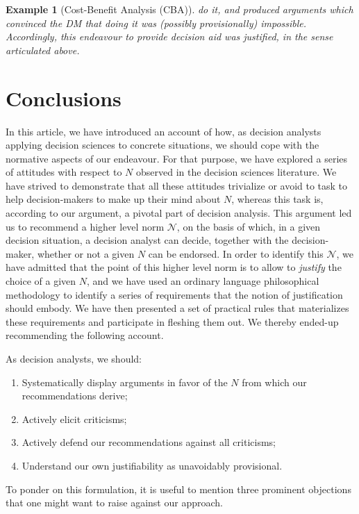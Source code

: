 \documentclass[preprint, french, english, 11pt, authoryear]{elsarticle}%
\newtheorem{example}{Example}
\newcommand{\adv}{\mathscr{N}}
\begin{document}
\begin{example}[Cost-Benefit Analysis (CBA)]
do it, and produced arguments which convinced the \ac{DM} that doing it was (possibly provisionally) impossible. Accordingly, this endeavour to provide decision aid was justified, in the sense articulated above.
\end{example}

\section{Conclusions}
In this article, we have introduced an account of how, as decision analysts applying decision sciences to concrete situations, we should cope with the normative aspects of our endeavour. For that purpose, we have explored a series of attitudes with respect to $N$ observed in the decision sciences literature. We have strived to demonstrate that all these attitudes trivialize or avoid to task to help decision-makers to make up their mind about $N$, whereas this task is, according to our argument, a pivotal part of decision analysis. This argument led us to recommend a higher level norm $\adv$, on the basis of which, in a given decision situation, a decision analyst can decide, together with the decision-maker, whether or not a given $N$ can be endorsed. In order to identify this $\adv$, we have admitted that the point of this higher level norm is to allow to \emph{justify} the choice of a given $N$, and we have used an ordinary language philosophical methodology to identify a series of requirements that the notion of justification should embody. We have then presented a set of practical rules that materializes these requirements and participate in fleshing them out. We thereby ended-up recommending the following account.

As decision analysts, we should:
\begin{enumerate}[label=\roman*.]
	\item Systematically display arguments in favor of the $N$ from which our recommendations derive;
	\item Actively elicit criticisms;
	\item Actively defend our recommendations against all criticisms;
	\item Understand our own justifiability as unavoidably provisional.
\end{enumerate}

To ponder on this formulation, it is useful to mention three prominent objections that one might want to raise against our approach.
\end{document}
